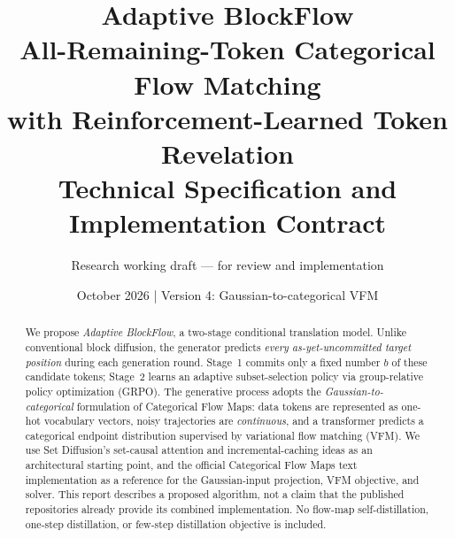 \documentclass[11pt,a4paper]{article}
\title{\vspace{-1.0cm}\textbf{Adaptive BlockFlow}\\[3pt]
\large All-Remaining-Token Categorical Flow Matching\\with Reinforcement-Learned Token Revelation\\[9pt]
\normalsize Technical Specification and Implementation Contract}
\author{Research working draft --- for review and implementation}
\date{October 2026 \quad | \quad Version 4: Gaussian-to-categorical VFM}
\begin{document}
\maketitle
\vspace{-0.7cm}
\begin{abstract}
We propose \emph{Adaptive BlockFlow}, a two-stage conditional translation model. Unlike conventional block diffusion, the generator predicts \emph{every as-yet-uncommitted target position} during each generation round. Stage~1 commits only a fixed number $b$ of these candidate tokens; Stage~2 learns an adaptive subset-selection policy via group-relative policy optimization (GRPO). The generative process adopts the \emph{Gaussian-to-categorical} formulation of Categorical Flow Maps: data tokens are represented as one-hot vocabulary vectors, noisy trajectories are \emph{continuous}, and a transformer predicts a categorical endpoint distribution supervised by variational flow matching (VFM). We use Set Diffusion's set-causal attention and incremental-caching ideas as an architectural starting point, and the official Categorical Flow Maps text implementation as a reference for the Gaussian-input projection, VFM objective, and solver. This report describes a proposed algorithm, not a claim that the published repositories already provide its combined implementation. No flow-map self-distillation, one-step distillation, or few-step distillation objective is included.
\end{abstract}
\vspace{0.2cm}
\tableofcontents
\newpage
\end{document}
